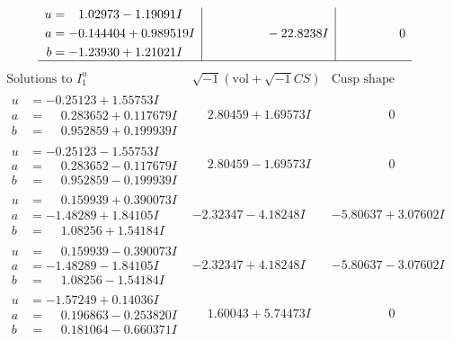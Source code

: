 \documentclass[1p]{elsarticle_modified}
\theoremstyle{definition}
\newcommand{\I}{\sqrt{-1}}
\begin{document}
$$\begin{array}{c|c|c}
\begin{aligned}
u &= \phantom{-}1.02973 - 1.19091 I \\
a &= -0.144404 + 0.989519 I \\
b &= -1.23930 + 1.21021 I\end{aligned}
 & \phantom{-0.000000 } -22.8238 I & \phantom{-0.000000 } 0\\
 \hline 
 \end{array}$$\newpage$$\begin{array}{c|c|c}  
\text{Solutions to }I^u_{1}& \I (\text{vol} + \sqrt{-1}CS) & \text{Cusp shape}\\
 \hline 
\begin{aligned}
u &= -0.25123 + 1.55753 I \\
a &= \phantom{-}0.283652 + 0.117679 I \\
b &= \phantom{-}0.952859 + 0.199939 I\end{aligned}
 & \phantom{-}2.80459 + 1.69573 I & \phantom{-0.000000 } 0 \\ \hline\begin{aligned}
u &= -0.25123 - 1.55753 I \\
a &= \phantom{-}0.283652 - 0.117679 I \\
b &= \phantom{-}0.952859 - 0.199939 I\end{aligned}
 & \phantom{-}2.80459 - 1.69573 I & \phantom{-0.000000 } 0 \\ \hline\begin{aligned}
u &= \phantom{-}0.159939 + 0.390073 I \\
a &= -1.48289 + 1.84105 I \\
b &= \phantom{-}1.08256 + 1.54184 I\end{aligned}
 & -2.32347 - 4.18248 I & -5.80637 + 3.07602 I \\ \hline\begin{aligned}
u &= \phantom{-}0.159939 - 0.390073 I \\
a &= -1.48289 - 1.84105 I \\
b &= \phantom{-}1.08256 - 1.54184 I\end{aligned}
 & -2.32347 + 4.18248 I & -5.80637 - 3.07602 I \\ \hline\begin{aligned}
u &= -1.57249 + 0.14036 I \\
a &= \phantom{-}0.196863 - 0.253820 I \\
b &= \phantom{-}0.181064 - 0.660371 I\end{aligned}
 & \phantom{-}1.60043 + 5.74473 I & \phantom{-0.000000 } 0 \\ \hline\begin{aligned}

\end{aligned}
\end{array}$$
\end{document}
